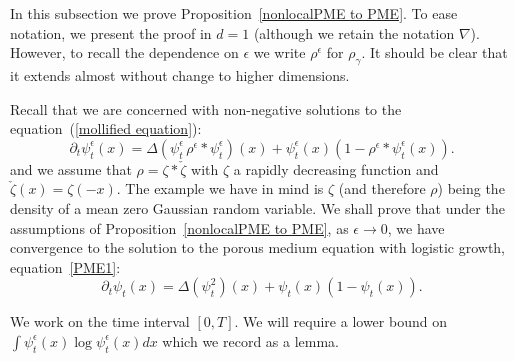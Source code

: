 \documentclass[EJP]{ejpecp} %
\begin{document}
In this subsection we prove Proposition~\ref{nonlocalPME to PME}.
To ease notation, we present
the proof in $d=1$ (although we retain the notation $\nabla$).
However, to recall the dependence on $\epsilon$ we write $\rho^\epsilon$ for $\rho_\gamma$.
It should be clear that it extends almost without change
to higher dimensions. 

Recall that 
we are concerned with non-negative solutions to the equation~(\ref{mollified equation}):
\begin{equation*}
	\partial_t\psi_t^\epsilon(x) =
	\Delta\left(\psi_t^\epsilon \, \rho^\epsilon *\psi_t^\epsilon\right)(x)
	+\psi_t^\epsilon(x)\left(1-\rho^\epsilon *\psi_t^\epsilon(x) 
\right) .
\end{equation*}
and 
we assume that $\rho=\zeta*\check{\zeta}$ with $\zeta$ a rapidly decreasing function
and $\check{\zeta}(x) = \zeta(-x)$.
The example we have in mind is $\zeta$ (and therefore $\rho$) being the density of
a mean zero Gaussian random variable.  
We shall prove that under the 
assumptions of Proposition~\ref{nonlocalPME to PME},
as $\epsilon\to 0$, we have
convergence to the solution to the porous medium equation with
logistic growth,
equation~\eqref{PME1}:
\begin{equation*}
	\partial_t \psi_t(x)=
	\Delta\left(\psi_t^2\right)(x)
	+\psi_t(x)\left(1-\psi_t(x)\right).
\end{equation*}

We work on the time interval $[0,T]$.
We will require a lower bound on $\int \psi_t^\epsilon(x)\log \psi_t^\epsilon(x) dx$ 
which we record as a lemma.
\end{document}
